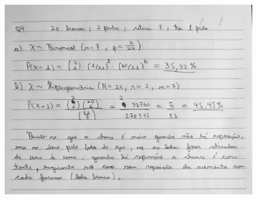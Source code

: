 \documentclass[12pt]{article}
\begin{document}
	\begin{figure}[h!]
		\includegraphics[scale=0.2]{q4}
	\end{figure}
\end{document}
